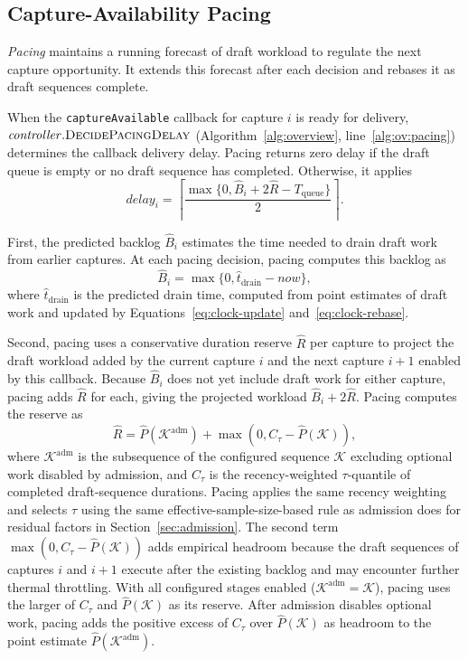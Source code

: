 \subsection{Capture-Availability Pacing}
\label{sec:pacing}

\emph{Pacing} maintains a running forecast of draft workload to regulate the next capture opportunity.
It extends this forecast after each decision and rebases it as draft sequences complete.

When the \texttt{captureAvailable} callback for capture \(i\) is ready for delivery, \(\mathit{controller}.\textsc{DecidePacingDelay}\) (Algorithm~\ref{alg:overview}, line~\ref{alg:ov:pacing}) determines the callback delivery delay.
Pacing returns zero delay if the draft queue is empty or no draft sequence has completed.
Otherwise, it applies
\begin{equation*}
  \mathit{delay}_i
  =
  \left\lceil
    \frac{
      \max\{0,\hat B_i+2\hat R-T_{\mathrm{queue}}\}
    }{2}
  \right\rceil.
\end{equation*}

First, the predicted backlog \(\hat B_i\) estimates the time needed to drain draft work from earlier captures.
At each pacing decision, pacing computes this backlog as
\begin{equation*}
  \hat B_i
  =
  \max\{0,\hat t_{\mathrm{drain}}-\mathit{now}\},
\end{equation*}
where \(\hat t_{\mathrm{drain}}\) is the predicted drain time, computed from point estimates of draft work and updated by Equations~\eqref{eq:clock-update} and~\eqref{eq:clock-rebase}.

Second, pacing uses a conservative duration reserve \(\hat R\) per capture to project the draft workload added by the current capture \(i\) and the next capture \(i+1\) enabled by this callback.
Because \(\hat B_i\) does not yet include draft work for either capture, pacing adds \(\hat R\) for each, giving the projected workload \(\hat B_i+2\hat R\).
Pacing computes the reserve as
\begin{equation*}
  \hat R
  =
  \hat P(\mathcal K^{\mathrm{adm}})
  +
  \max\!\left(0,C_\tau-\hat P(\mathcal K)\right),
\end{equation*}
where \(\mathcal K^{\mathrm{adm}}\) is the subsequence of the configured sequence \(\mathcal K\) excluding optional work disabled by admission, and \(C_\tau\) is the recency-weighted \(\tau\)-quantile of completed draft-sequence durations.
Pacing applies the same recency weighting and selects \(\tau\) using the same effective-sample-size-based rule as admission does for residual factors in Section~\ref{sec:admission}.
The second term \(\max(0,C_\tau-\hat P(\mathcal K))\) adds empirical headroom because the draft sequences of captures \(i\) and \(i+1\) execute after the existing backlog and may encounter further thermal throttling.
With all configured stages enabled (\(\mathcal K^{\mathrm{adm}}=\mathcal K\)), pacing uses the larger of \(C_\tau\) and \(\hat P(\mathcal K)\) as its reserve.
After admission disables optional work, pacing adds the positive excess of \(C_\tau\) over \(\hat P(\mathcal K)\) as headroom to the point estimate \(\hat P(\mathcal K^{\mathrm{adm}})\).

